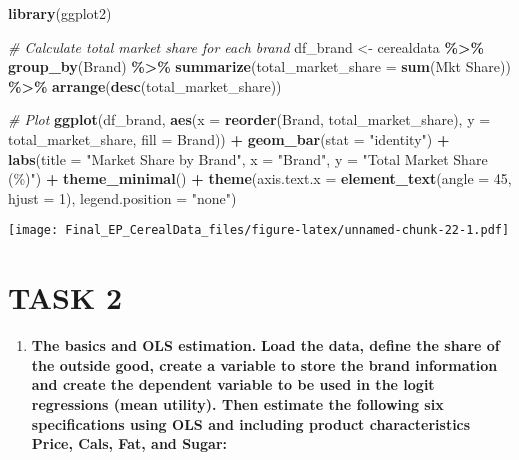 \documentclass[
]{article}
\newenvironment{Shaded}{\begin{snugshade}}{\end{snugshade}}
\newcommand{\AttributeTok}[1]{\textcolor[rgb]{0.13,0.29,0.53}{#1}}
\newcommand{\CommentTok}[1]{\textcolor[rgb]{0.56,0.35,0.01}{\textit{#1}}}
\newcommand{\DecValTok}[1]{\textcolor[rgb]{0.00,0.00,0.81}{#1}}
\newcommand{\FunctionTok}[1]{\textcolor[rgb]{0.13,0.29,0.53}{\textbf{#1}}}
\newcommand{\NormalTok}[1]{#1}
\newcommand{\OtherTok}[1]{\textcolor[rgb]{0.56,0.35,0.01}{#1}}
\newcommand{\SpecialCharTok}[1]{\textcolor[rgb]{0.81,0.36,0.00}{\textbf{#1}}}
\newcommand{\StringTok}[1]{\textcolor[rgb]{0.31,0.60,0.02}{#1}}
\providecommand{\tightlist}{%
  \setlength{\itemsep}{0pt}\setlength{\parskip}{0pt}}
\begin{document}
\begin{Shaded}
\begin{Highlighting}[]
\FunctionTok{library}\NormalTok{(ggplot2)}

\CommentTok{\# Calculate total market share for each brand}
\NormalTok{df\_brand }\OtherTok{\textless{}{-}}\NormalTok{ cerealdata }\SpecialCharTok{\%\textgreater{}\%}
  \FunctionTok{group\_by}\NormalTok{(Brand) }\SpecialCharTok{\%\textgreater{}\%}
  \FunctionTok{summarize}\NormalTok{(}\AttributeTok{total\_market\_share =} \FunctionTok{sum}\NormalTok{(}\StringTok{\textasciigrave{}}\AttributeTok{Mkt Share}\StringTok{\textasciigrave{}}\NormalTok{)) }\SpecialCharTok{\%\textgreater{}\%}
  \FunctionTok{arrange}\NormalTok{(}\FunctionTok{desc}\NormalTok{(total\_market\_share))}

\CommentTok{\# Plot}
\FunctionTok{ggplot}\NormalTok{(df\_brand, }\FunctionTok{aes}\NormalTok{(}\AttributeTok{x =} \FunctionTok{reorder}\NormalTok{(Brand, total\_market\_share), }\AttributeTok{y =}\NormalTok{ total\_market\_share, }\AttributeTok{fill =}\NormalTok{ Brand)) }\SpecialCharTok{+}
  \FunctionTok{geom\_bar}\NormalTok{(}\AttributeTok{stat =} \StringTok{"identity"}\NormalTok{) }\SpecialCharTok{+}
  \FunctionTok{labs}\NormalTok{(}\AttributeTok{title =} \StringTok{"Market Share by Brand"}\NormalTok{,}
       \AttributeTok{x =} \StringTok{"Brand"}\NormalTok{,}
       \AttributeTok{y =} \StringTok{"Total Market Share (\%)"}\NormalTok{) }\SpecialCharTok{+}
  \FunctionTok{theme\_minimal}\NormalTok{() }\SpecialCharTok{+}
  \FunctionTok{theme}\NormalTok{(}\AttributeTok{axis.text.x =} \FunctionTok{element\_text}\NormalTok{(}\AttributeTok{angle =} \DecValTok{45}\NormalTok{, }\AttributeTok{hjust =} \DecValTok{1}\NormalTok{),}
        \AttributeTok{legend.position =} \StringTok{"none"}\NormalTok{)}
\end{Highlighting}
\end{Shaded}

\texttt{[image: Final\_EP\_CerealData\_files/figure-latex/unnamed-chunk-22-1.pdf]}

\section{TASK 2}\label{task-2}

\begin{enumerate}
\def\labelenumi{\arabic{enumi}.}
\setcounter{enumi}{1}
\tightlist
\item
  \textbf{The basics and OLS estimation.} \textbf{Load the data, define
  the share of the outside good, create a variable to store the brand
  information and create the dependent variable to be used in the logit
  regressions (mean utility). Then estimate the following six
  specifications using OLS and including product characteristics Price,
  Cals, Fat, and Sugar:}
\end{enumerate}
\end{document}
